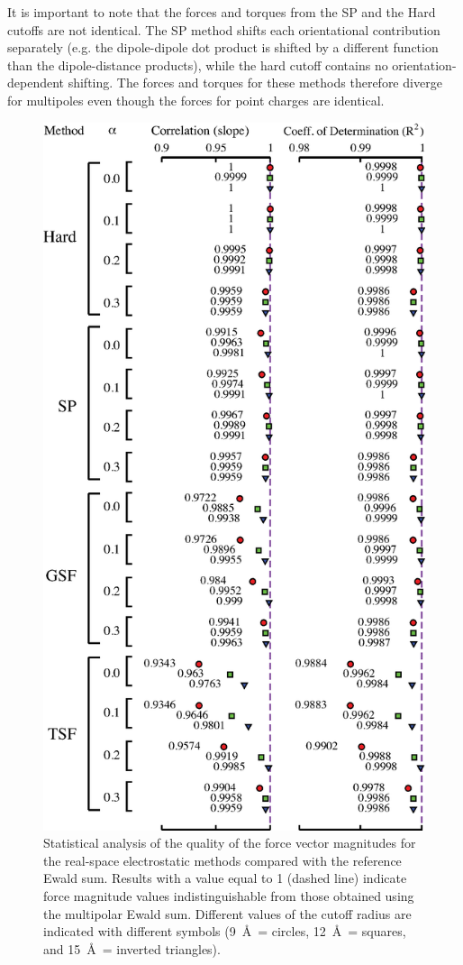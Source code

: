 It is important to note that the forces and torques from the SP and
the Hard cutoffs are not identical. The SP method shifts each
orientational contribution separately (e.g. the dipole-dipole dot
product is shifted by a different function than the dipole-distance
products), while the hard cutoff contains no orientation-dependent
shifting.  The forces and torques for these methods therefore diverge
for multipoles even though the forces for point charges are identical.

\begin{figure}
  \centering
  \includegraphics[width=0.6\linewidth]{forcePlot_slopeCorrelation_combined.eps} 
  \caption{Statistical analysis of the quality of the force vector
    magnitudes for the real-space electrostatic methods compared with
    the reference Ewald sum. Results with a value equal to 1 (dashed
    line) indicate force magnitude values indistinguishable from those
    obtained using the multipolar Ewald sum.  Different values of the
    cutoff radius are indicated with different symbols (9~\AA\ =
    circles, 12~\AA\ = squares, and 15~\AA\ = inverted
    triangles).\label{fig:slopeCorr_force}}
\end{figure} 


